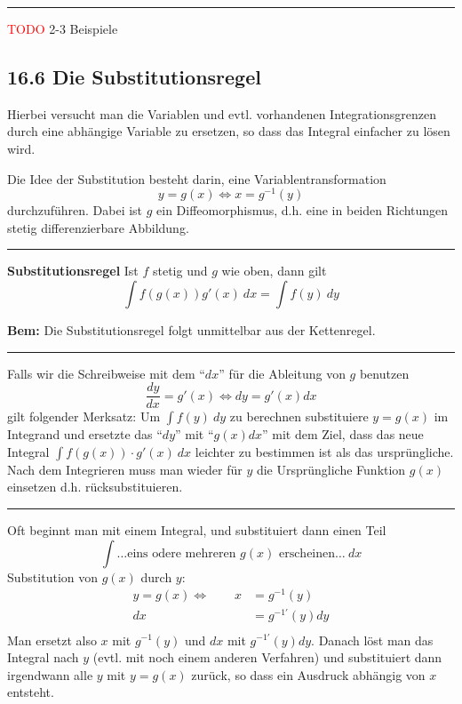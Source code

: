 \documentclass[a4paper,landscape,8pt]{extarticle}
\newcommand{\todo}{\textcolor{red}{TODO }}
\newcommand{\sep}{\vspace{5pt}\noindent\hrule\vspace{5pt}}
\newcommand{\Bem}{\textbf{Bem: }}
\begin{document}
\begin{multicols*}{4}
\begin{warmup}
\sep

\Bsp \todo 2-3 Beispiele
\end{warmup}


\subsection{16.6 Die Substitutionsregel}

Hierbei versucht man die Variablen und evtl. vorhandenen Integrationsgrenzen
durch eine abhängige Variable zu ersetzen, so dass das Integral einfacher zu
lösen wird.

Die Idee der Substitution besteht darin, eine Variablentransformation
\[
y = g(x)	\Longleftrightarrow x = g^{-1}(y)
\]
durchzuführen. Dabei ist $g$ ein Diffeomorphismus, d.h. eine in beiden
Richtungen stetig differenzierbare Abbildung.

\sep

\Satz \textbf{Substitutionsregel} Ist $f$ stetig und $g$ wie oben, dann gilt
\[
\int f(g(x))g'(x) \ dx = \int f(y) \ dy
\]

\Bem Die Substitutionsregel folgt unmittelbar aus der Kettenregel.

\sep

\Vorgehen Falls wir die Schreibweise mit dem ``$dx$'' für die Ableitung von $g$
benutzen
\[
\frac{dy}{dx} = g'(x) \Longleftrightarrow dy = g'(x) dx
\]
gilt folgender Merksatz: Um $\int f(y) \ dy$ zu berechnen substituiere $y=g(x)$
im Integrand und ersetzte das ``$dy$'' mit ``$g(x)dx$'' mit dem Ziel, dass das
neue Integral $\int f(g(x))\cdot g'(x) \ dx$ leichter zu bestimmen ist als das
ursprüngliche. Nach dem Integrieren muss man wieder für $y$ die Ursprüngliche
Funktion $g(x)$ einsetzen d.h. rücksubstituieren.

\sep

\Vorgehen Oft beginnt man mit einem Integral, und substituiert dann einen Teil
\[
\int \ldots\text{eins odere mehreren } g(x) \text{ erscheinen} \ldots \ dx
\]
Substitution von $g(x)$ durch $y$:
\begin{align*}
y = g(x) \Longleftrightarrow \qquad x&=g^{-1}(y)\\
dx &= g^{-1\prime}(y) dy\\
\end{align*}
Man ersetzt also $x$ mit $g^{-1}(y)$ und $dx$ mit $g^{-1\prime}(y) dy$. Danach
löst man das Integral nach $y$ (evtl. mit noch einem anderen Verfahren) und 
substituiert dann irgendwann alle $y$ mit $y=g(x)$ zurück, so dass ein Ausdruck
abhängig von $x$ entsteht.


\end{multicols*}
\end{document}
